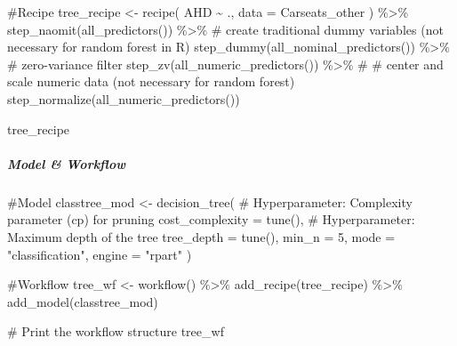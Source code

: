 \documentclass[
]{article}
\let\oldsubparagraph\subparagraph
\renewcommand{\subparagraph}[1]{\oldsubparagraph{#1}\mbox{}}
\newenvironment{Shaded}{\begin{snugshade}}{\end{snugshade}}
\newcommand{\AttributeTok}[1]{\textcolor[rgb]{0.40,0.45,0.13}{#1}}
\newcommand{\CommentTok}[1]{\textcolor[rgb]{0.37,0.37,0.37}{#1}}
\newcommand{\DecValTok}[1]{\textcolor[rgb]{0.68,0.00,0.00}{#1}}
\newcommand{\FunctionTok}[1]{\textcolor[rgb]{0.28,0.35,0.67}{#1}}
\newcommand{\NormalTok}[1]{\textcolor[rgb]{0.00,0.23,0.31}{#1}}
\newcommand{\OtherTok}[1]{\textcolor[rgb]{0.00,0.23,0.31}{#1}}
\newcommand{\SpecialCharTok}[1]{\textcolor[rgb]{0.37,0.37,0.37}{#1}}
\newcommand{\StringTok}[1]{\textcolor[rgb]{0.13,0.47,0.30}{#1}}
\begin{document}
\begin{Shaded}
\begin{Highlighting}[]
\CommentTok{\#Recipe}
\NormalTok{tree\_recipe }\OtherTok{\textless{}{-}} 
  \FunctionTok{recipe}\NormalTok{(}
\NormalTok{    AHD }\SpecialCharTok{\textasciitilde{}}\NormalTok{ ., }
    \AttributeTok{data =}\NormalTok{ Carseats\_other}
\NormalTok{  ) }\SpecialCharTok{\%\textgreater{}\%}
  \FunctionTok{step\_naomit}\NormalTok{(}\FunctionTok{all\_predictors}\NormalTok{()) }\SpecialCharTok{\%\textgreater{}\%}
  \CommentTok{\# create traditional dummy variables (not necessary for random forest in R)}
  \FunctionTok{step\_dummy}\NormalTok{(}\FunctionTok{all\_nominal\_predictors}\NormalTok{()) }\SpecialCharTok{\%\textgreater{}\%}
  \CommentTok{\# zero{-}variance filter}
  \FunctionTok{step\_zv}\NormalTok{(}\FunctionTok{all\_numeric\_predictors}\NormalTok{()) }\SpecialCharTok{\%\textgreater{}\%} 
  \CommentTok{\# \# center and scale numeric data (not necessary for random forest)}
  \FunctionTok{step\_normalize}\NormalTok{(}\FunctionTok{all\_numeric\_predictors}\NormalTok{()) }

\NormalTok{tree\_recipe}
\end{Highlighting}
\end{Shaded}

\hypertarget{model-workflow}{%
\subparagraph{Model \& Workflow}\label{model-workflow}}

\begin{Shaded}
\begin{Highlighting}[]
\CommentTok{\#Model}
\NormalTok{classtree\_mod }\OtherTok{\textless{}{-}} \FunctionTok{decision\_tree}\NormalTok{(}
   \CommentTok{\# Hyperparameter: Complexity parameter (cp) for pruning}
  \AttributeTok{cost\_complexity =} \FunctionTok{tune}\NormalTok{(),}
  \CommentTok{\# Hyperparameter: Maximum depth of the tree}
  \AttributeTok{tree\_depth =} \FunctionTok{tune}\NormalTok{(),}
  \AttributeTok{min\_n =} \DecValTok{5}\NormalTok{,}
  \AttributeTok{mode =} \StringTok{"classification"}\NormalTok{,}
  \AttributeTok{engine =} \StringTok{"rpart"}
\NormalTok{  ) }

\CommentTok{\#Workflow}
\NormalTok{tree\_wf }\OtherTok{\textless{}{-}} \FunctionTok{workflow}\NormalTok{() }\SpecialCharTok{\%\textgreater{}\%}
  \FunctionTok{add\_recipe}\NormalTok{(tree\_recipe) }\SpecialCharTok{\%\textgreater{}\%}
  \FunctionTok{add\_model}\NormalTok{(classtree\_mod) }

\CommentTok{\# Print the workflow structure}
\NormalTok{tree\_wf}
\end{Highlighting}
\end{Shaded}
\end{document}
